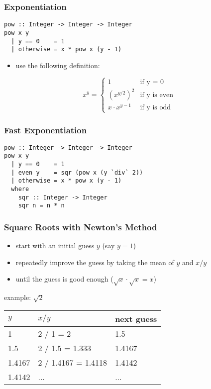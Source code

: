 \documentclass[dvipsnames]{beamer}
\theoremstyle{plain}
\begin{document}
\begin{frame}[fragile]
  \frametitle{Exponentiation}

  \begin{lstlisting}
pow :: Integer -> Integer -> Integer
pow x y
  | y == 0    = 1
  | otherwise = x * pow x (y - 1)
  \end{lstlisting}

  \pause
  \begin{itemize}
    \item use the following definition:
  \end{itemize}
  \[
    x^y =
      \begin{cases}
        1               & \mbox{if y = 0}\\
        {(x^{y/2})}^2   & \mbox{if y is even}\\
        x \cdot x^{y-1} & \mbox{if y is odd}
      \end{cases}
  \]
\end{frame}

\begin{frame}[fragile]
  \frametitle{Fast Exponentiation}

  \begin{lstlisting}
pow :: Integer -> Integer -> Integer
pow x y
  | y == 0    = 1
  | even y    = sqr (pow x (y `div` 2))
  | otherwise = x * pow x (y - 1)
  where
    sqr :: Integer -> Integer
    sqr n = n * n
  \end{lstlisting}
\end{frame}

\lstset{deletekeywords=sqrt}

\begin{frame}
  \frametitle{Square Roots with Newton's Method}

  \begin{itemize}
    \item start with an initial guess $y$ (say $y = 1$)
    \item repeatedly improve the guess by taking the mean of $y$
      and $x / y$
    \item until the guess is good enough ($\sqrt x \cdot \sqrt x = x$)
  \end{itemize}

  \medskip
  \begin{exampleblock}{example: $\sqrt{2}$}
    \begin{center}
      \begin{tabular}{lll}
      $y$      & $x / y$             & next guess\\\hline
      1        & 2 / 1 = 2           & 1.5\\
      1.5      & 2 / 1.5 = 1.333     & 1.4167\\
      1.4167   & 2 / 1.4167 = 1.4118 & 1.4142\\
      1.4142   & ...                 & ...
      \end{tabular}
    \end{center}
  \end{exampleblock}
\end{frame}
\end{document}
